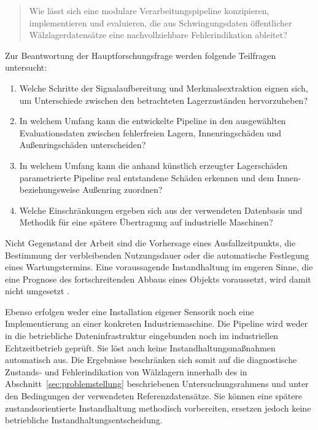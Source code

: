 \begin{quote}
    Wie lässt sich eine modulare Verarbeitungspipeline konzipieren, implementieren und evaluieren,
    die aus Schwingungsdaten öffentlicher Wälzlagerdatensätze
    eine nachvollziehbare Fehlerindikation ableitet?
\end{quote}

Zur Beantwortung der Hauptforschungsfrage werden folgende Teilfragen untersucht:

\begin{enumerate}
    \item Welche Schritte der Signalaufbereitung und Merkmalsextraktion eignen sich,
          um Unterschiede zwischen den betrachteten Lagerzuständen hervorzuheben?
    \item In welchem Umfang kann die entwickelte Pipeline in den ausgewählten
          Evaluationsdaten zwischen fehlerfreien Lagern, Innenringschäden und
          Außenringschäden unterscheiden?
    \item In welchem Umfang kann die anhand künstlich erzeugter Lagerschäden
          parametrierte Pipeline real entstandene Schäden erkennen und dem
          Innen- beziehungsweise Außenring zuordnen?
    \item Welche Einschränkungen ergeben sich aus der verwendeten Datenbasis und Methodik
          für eine spätere Übertragung auf industrielle Maschinen?
\end{enumerate}


Nicht Gegenstand der Arbeit sind die Vorhersage eines Ausfallzeitpunkts,
die Bestimmung der verbleibenden Nutzungsdauer
oder die automatische Festlegung eines Wartungstermins.
Eine voraussagende Instandhaltung im engeren Sinne,
die eine Prognose des fortschreitenden Abbaus eines Objekts voraussetzt,
wird damit nicht umgesetzt \cite[Abschn. 7.4]{zotero-item-24}.

Ebenso erfolgen weder eine Installation eigener Sensorik
noch eine Implementierung an einer konkreten Industriemaschine.
Die Pipeline wird weder in die betriebliche Dateninfrastruktur eingebunden
noch im industriellen Echtzeitbetrieb geprüft.
Sie löst auch keine Instandhaltungsmaßnahmen automatisch aus.
Die Ergebnisse beschränken sich somit auf die diagnostische Zustands- und Fehlerindikation
von Wälzlagern innerhalb des in Abschnitt~\ref{sec:problemstellung} beschriebenen Untersuchungsrahmens
und unter den Bedingungen der verwendeten Referenzdatensätze.
Sie können eine spätere zustandsorientierte Instandhaltung methodisch vorbereiten,
ersetzen jedoch keine betriebliche Instandhaltungsentscheidung.

